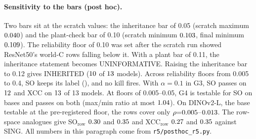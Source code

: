 \documentclass[10pt]{article}
\begin{document}
\paragraph{Sensitivity to the bars (post hoc).} Two bars sit at the scratch values: the inheritance bar of 0.05 (scratch maximum $0.040$) and the plant-check bar of 0.10 (scratch minimum $0.103$, final minimum $0.109$). The reliability floor of 0.10 was set after the scratch run showed ResNet50's world-C rows falling below it. With a plant bar of 0.11, the inheritance statement becomes UNINFORMATIVE. Raising the inheritance bar to 0.12 gives INHERITED ($10$ of $13$ models). Across reliability floors from 0.005 to 0.4, SO keeps its label (\FSOFloorLabels), and no kill fires. With $\alpha{=}0.1$ in G3, SO passes on $12$ and XCC on $13$ of 13 models. At floors of 0.005--0.05, G4 is testable for SO on \FSOFloorLowTestable{} bases and passes on both (max/min ratio at most $1.04$). On DINOv2-L, the base testable at the pre-registered floor, the rows cover only $\rho{=}0.005$--$0.013$. The row-space analogues give SO$_{\mathrm{row}}$ $0.30$ and $0.35$ and XCC$_{\mathrm{row}}$ $0.27$ and $0.35$ against SING. All numbers in this paragraph come from \texttt{r5/posthoc\_r5.py}.

\begin{table}[H]
\centering\footnotesize
\resizebox{\linewidth}{!}{}
\caption{Round-5 scores and gates per model. rel: split-half reliability of SO$_{\mathrm{null}}$; $z$: XCC self-term; G2: mean over 5 class-mean derangements; G3: change at $\alpha{=}0.3$ in null-SD units for the semantic / arbitrary plant; F1-partial: full-null XCC with the row-space class Gram projected out. True DINO models are values only.}
\label{tab:r5gates}
\end{table}

\begin{table}[H]
\centering\footnotesize
\resizebox{\linewidth}{!}{}
\caption{Round-5 scores in the corrected worlds. G4 uses world C; worlds B (whole null part rescaled; truth: flat), M and D are descriptive. Ranges over estimable rows, count in parentheses.}
\label{tab:r5worlds}
\end{table}

\begin{table}[H]
\centering\footnotesize

\caption{Round-5 confirmatory test: Kendall $\tau$ with SING's order (model bootstrap, percentile 95\% CI), $\tau$ with $\rho$, and the partial Spearman given $\rho$. Labels: SO$_{\mathrm{null}}$ \FSOLabel, XCC$_{24}$ \FXCCLabel.}
\label{tab:r5confirm}
\end{table}
\end{document}
